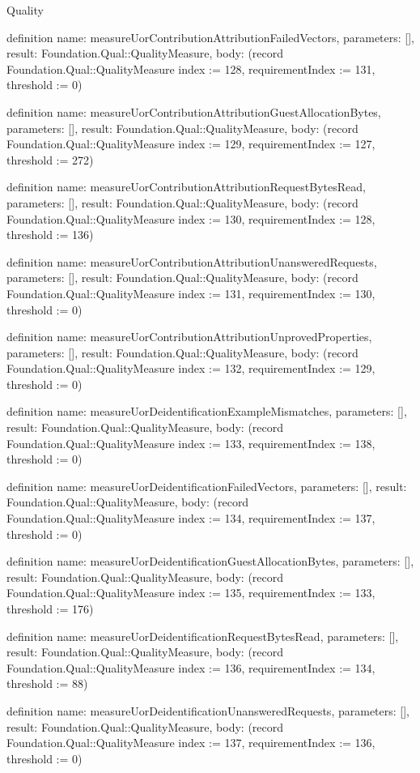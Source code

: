 \begin{lexlean}{Quality}
\begin{semanticmodule}
definition{
  name: measureUorContributionAttributionFailedVectors,
  parameters: [],
  result: Foundation.Qual::QualityMeasure,
  body: (record Foundation.Qual::QualityMeasure {index := 128, requirementIndex := 131, threshold := 0})
}

definition{
  name: measureUorContributionAttributionGuestAllocationBytes,
  parameters: [],
  result: Foundation.Qual::QualityMeasure,
  body: (record Foundation.Qual::QualityMeasure {index := 129, requirementIndex := 127, threshold := 272})
}

definition{
  name: measureUorContributionAttributionRequestBytesRead,
  parameters: [],
  result: Foundation.Qual::QualityMeasure,
  body: (record Foundation.Qual::QualityMeasure {index := 130, requirementIndex := 128, threshold := 136})
}

definition{
  name: measureUorContributionAttributionUnansweredRequests,
  parameters: [],
  result: Foundation.Qual::QualityMeasure,
  body: (record Foundation.Qual::QualityMeasure {index := 131, requirementIndex := 130, threshold := 0})
}

definition{
  name: measureUorContributionAttributionUnprovedProperties,
  parameters: [],
  result: Foundation.Qual::QualityMeasure,
  body: (record Foundation.Qual::QualityMeasure {index := 132, requirementIndex := 129, threshold := 0})
}

definition{
  name: measureUorDeidentificationExampleMismatches,
  parameters: [],
  result: Foundation.Qual::QualityMeasure,
  body: (record Foundation.Qual::QualityMeasure {index := 133, requirementIndex := 138, threshold := 0})
}

definition{
  name: measureUorDeidentificationFailedVectors,
  parameters: [],
  result: Foundation.Qual::QualityMeasure,
  body: (record Foundation.Qual::QualityMeasure {index := 134, requirementIndex := 137, threshold := 0})
}

definition{
  name: measureUorDeidentificationGuestAllocationBytes,
  parameters: [],
  result: Foundation.Qual::QualityMeasure,
  body: (record Foundation.Qual::QualityMeasure {index := 135, requirementIndex := 133, threshold := 176})
}

definition{
  name: measureUorDeidentificationRequestBytesRead,
  parameters: [],
  result: Foundation.Qual::QualityMeasure,
  body: (record Foundation.Qual::QualityMeasure {index := 136, requirementIndex := 134, threshold := 88})
}

definition{
  name: measureUorDeidentificationUnansweredRequests,
  parameters: [],
  result: Foundation.Qual::QualityMeasure,
  body: (record Foundation.Qual::QualityMeasure {index := 137, requirementIndex := 136, threshold := 0})
}


\end{semanticmodule}
\end{lexlean}
